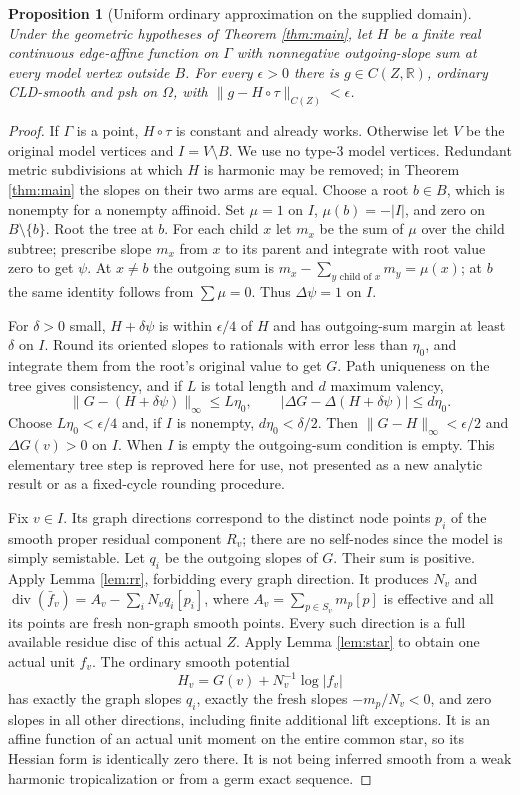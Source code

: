 \documentclass[11pt]{article}
\newtheorem{proposition}[theorem]{Proposition}
\begin{document}
\begin{proposition}[Uniform ordinary approximation on the supplied domain]\label{prop:raw}
Under the geometric hypotheses of Theorem \ref{thm:main}, let $H$
be a finite real continuous edge-affine function on $\Gamma$ with
nonnegative outgoing-slope sum at every model vertex outside $B$.
For every $\epsilon>0$ there is $g\in C(Z,\mathbb R)$, ordinary
CLD-smooth and psh on $\Omega$, with
$\|g-H\circ\tau\|_{C(Z)}<\epsilon$.
\end{proposition}
\begin{proof}
If $\Gamma$ is a point, $H\circ\tau$ is constant and already
works. Otherwise let $V$ be the original model vertices and
$I=V\setminus B$. We use no type-3 model vertices. Redundant
metric subdivisions at which $H$ is harmonic may be removed;
in Theorem \ref{thm:main} the slopes on their two arms are equal.
Choose a root $b\in B$, which is nonempty for a nonempty
affinoid. Set $\mu=1$ on $I$, $\mu(b)=-|I|$, and zero on
$B\setminus\{b\}$. Root the tree at $b$. For each child $x$
let $m_x$ be the sum of $\mu$ over the child subtree; prescribe
slope $m_x$ from $x$ to its parent and integrate with root value
zero to get $\psi$. At $x\ne b$ the outgoing sum is
$m_x-\sum_{y\text{ child of }x}m_y=\mu(x)$; at $b$ the same
identity follows from $\sum\mu=0$. Thus $\Delta\psi=1$ on $I$.

For $\delta>0$ small, $H+\delta\psi$ is within $\epsilon/4$
of $H$ and has outgoing-sum margin at least $\delta$ on $I$.
Round its oriented slopes to rationals with error less than
$\eta_0$, and integrate them from the root's original value to
get $G$. Path uniqueness on the tree gives consistency, and if
$L$ is total length and $d$ maximum valency,
\[
 \|G-(H+\delta\psi)\|_\infty\leq L\eta_0,
 \qquad |\Delta G-\Delta(H+\delta\psi)|\leq d\eta_0.
\]
Choose $L\eta_0<\epsilon/4$ and, if $I$ is nonempty,
$d\eta_0<\delta/2$. Then
$\|G-H\|_\infty<\epsilon/2$ and $\Delta G(v)>0$ on $I$.
When $I$ is empty the outgoing-sum condition is empty.
This elementary tree step is reproved here for use, not presented
as a new analytic result or as a fixed-cycle rounding procedure.

Fix $v\in I$. Its graph directions correspond to the distinct
node points $p_i$ of the smooth proper residual component $R_v$;
there are no self-nodes since the model is simply semistable.
Let $q_i$ be the outgoing slopes of $G$. Their sum is positive.
Apply Lemma \ref{lem:rr}, forbidding every graph direction.
It produces $N_v$ and
$\operatorname{div}(\bar f_v)=A_v-\sum_i N_vq_i[p_i]$,
where $A_v=\sum_{p\in S_v}m_p[p]$ is effective and all its
points are fresh non-graph smooth points. Every such direction
is a full available residue disc of this actual $Z$.
Apply Lemma \ref{lem:star} to obtain one actual unit $f_v$.
The ordinary smooth potential
\[
                   H_v=G(v)+N_v^{-1}\log|f_v|
\]
has exactly the graph slopes $q_i$, exactly the fresh slopes
$-m_p/N_v<0$, and zero slopes in all other directions, including
finite additional lift exceptions. It is an affine function of
an actual unit moment on the entire common star, so its Hessian
form is identically zero there. It is not being inferred smooth
from a weak harmonic tropicalization or from a germ exact sequence.


\end{proof}
\end{document}
